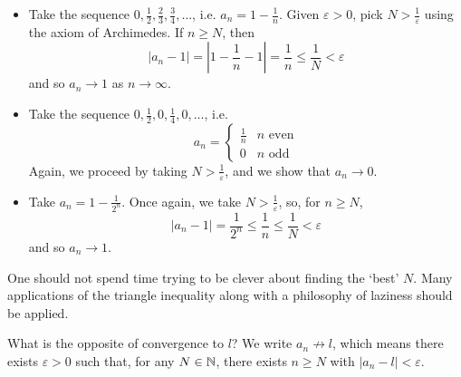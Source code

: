 \documentclass{../template/note}
\begin{document}
    \begin{example}
        \begin{itemize}
            \item Take the sequence \(0, \frac{1}{2}, \frac 2 3, \frac 3 4, \dots\), i.e. \(a_n = 1 - \frac 1 n\). Given \(\varepsilon > 0\), pick \(N > \frac 1 {\varepsilon}\) using the axiom of Archimedes. If \(n \geq N\), then
            \[
                |a_n - 1| = \left|1 - \frac{1}{n} - 1\right| = \frac{1}{n} \leq \frac{1}{N} < \varepsilon
            \]
            and so \(a_n \to 1\) as \(n \to \infty\).
            \item Take the sequence \(0, \frac 1 2, 0, \frac 1 4, 0, \dots\), i.e.
            \[
                a_n = \begin{cases}
                    \frac{1}{n} & n \text{ even} \\
                    0 & n \text{ odd}
                \end{cases}
            \]
            Again, we proceed by taking \(N > \frac{1}{\varepsilon}\), and we show that \(a_n \to 0\).
            \item Take \(a_n = 1 - \frac{1}{2^n}\). Once again, we take \(N > \frac{1}{\varepsilon}\), so, for \(n \geq N\),
            \[
                |a_n - 1| = \frac{1}{2^n} \leq \frac 1 n \leq \frac 1 N < \varepsilon
            \]
            and so \(a_n \to 1\).
        \end{itemize}
        
        
    \end{example}
    
    \begin{remark*}
        One should not spend time trying to be clever about finding the `best' \(N\). Many applications of the triangle inequality along with a philosophy of laziness should be applied.
    \end{remark*}
    
    
    What is the opposite of convergence to \(l\)? We write \(a_n \not \to l\), which means there exists \(\varepsilon > 0\) such that, for any \(N \in \mathbb N\), there exists \(n \geq N\) with \(|a_n - l| < \varepsilon\).
    
\end{document}
